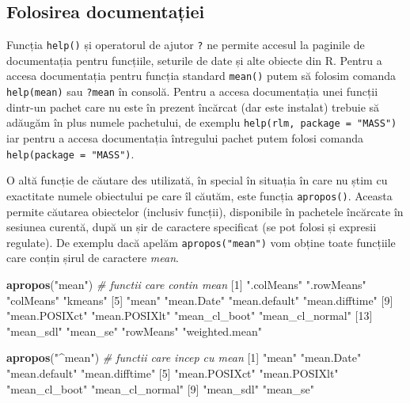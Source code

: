 \documentclass[]{article}
\newenvironment{Shaded}{\begin{snugshade}}{\end{snugshade}}
\newcommand{\KeywordTok}[1]{\textcolor[rgb]{0.13,0.29,0.53}{\textbf{#1}}}
\newcommand{\DecValTok}[1]{\textcolor[rgb]{0.00,0.00,0.81}{#1}}
\newcommand{\StringTok}[1]{\textcolor[rgb]{0.31,0.60,0.02}{#1}}
\newcommand{\CommentTok}[1]{\textcolor[rgb]{0.56,0.35,0.01}{\textit{#1}}}
\newcommand{\NormalTok}[1]{#1}
\begin{document}
\subsection{Folosirea documentației}\label{folosirea-documentatiei}

Funcția \texttt{help()} și operatorul de ajutor \texttt{?} ne permite
accesul la paginile de documentația pentru funcțiile, seturile de date
și alte obiecte din R. Pentru a accesa documentația pentru funcția
standard \texttt{mean()} putem să folosim comanda \texttt{help(mean)}
sau \texttt{?mean} în consolă. Pentru a accesa documentația unei funcții
dintr-un pachet care nu este în prezent încărcat (dar este instalat)
trebuie să adăugăm în plus numele pachetului, de exemplu
\texttt{help(rlm,\ package\ =\ "MASS")} iar pentru a accesa documentația
întregului pachet putem folosi comanda
\texttt{help(package\ =\ "MASS")}.

O altă funcție de căutare des utilizată, în special în situația în care
nu știm cu exactitate numele obiectului pe care îl căutăm, este funcția
\texttt{apropos()}. Aceasta permite căutarea obiectelor (inclusiv
funcții), disponibile în pachetele încărcate în sesiunea curentă, după
un șir de caractere specificat (se pot folosi și expresii regulate). De
exemplu dacă apelăm \texttt{apropos("mean")} vom obține toate funcțiile
care conțin șirul de caractere \emph{mean}.

\begin{Shaded}
\begin{Highlighting}[]
\KeywordTok{apropos}\NormalTok{(}\StringTok{"mean"}\NormalTok{) }\CommentTok{# functii care contin mean}
\NormalTok{ [}\DecValTok{1}\NormalTok{] }\StringTok{".colMeans"}      \StringTok{".rowMeans"}      \StringTok{"colMeans"}       \StringTok{"kmeans"}        
\NormalTok{ [}\DecValTok{5}\NormalTok{] }\StringTok{"mean"}           \StringTok{"mean.Date"}      \StringTok{"mean.default"}   \StringTok{"mean.difftime"} 
\NormalTok{ [}\DecValTok{9}\NormalTok{] }\StringTok{"mean.POSIXct"}   \StringTok{"mean.POSIXlt"}   \StringTok{"mean_cl_boot"}   \StringTok{"mean_cl_normal"}
\NormalTok{[}\DecValTok{13}\NormalTok{] }\StringTok{"mean_sdl"}       \StringTok{"mean_se"}        \StringTok{"rowMeans"}       \StringTok{"weighted.mean"} 

\KeywordTok{apropos}\NormalTok{(}\StringTok{"^mean"}\NormalTok{) }\CommentTok{# functii care incep cu mean}
\NormalTok{ [}\DecValTok{1}\NormalTok{] }\StringTok{"mean"}           \StringTok{"mean.Date"}      \StringTok{"mean.default"}   \StringTok{"mean.difftime"} 
\NormalTok{ [}\DecValTok{5}\NormalTok{] }\StringTok{"mean.POSIXct"}   \StringTok{"mean.POSIXlt"}   \StringTok{"mean_cl_boot"}   \StringTok{"mean_cl_normal"}
\NormalTok{ [}\DecValTok{9}\NormalTok{] }\StringTok{"mean_sdl"}       \StringTok{"mean_se"}       
\end{Highlighting}
\end{Shaded}
\end{document}
